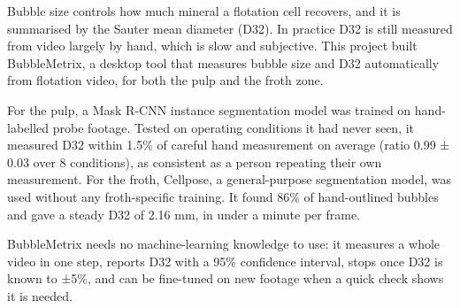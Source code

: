 Bubble size controls how much mineral a flotation cell recovers, and it is
summarised by the Sauter mean diameter (D32). In practice D32 is still
measured from video largely by hand, which is slow and subjective. This
project built BubbleMetrix, a desktop tool that measures bubble size and
D32 automatically from flotation video, for both the pulp and the froth
zone.

For the pulp, a Mask R-CNN instance segmentation model was trained on
hand-labelled probe footage. Tested on operating conditions it had never
seen, it measured D32 within 1.5\% of careful hand measurement on average
(ratio 0.99 ± 0.03 over 8 conditions), as consistent as a person repeating
their own measurement. For the froth, Cellpose, a general-purpose
segmentation model, was used without any froth-specific training. It found
86\% of hand-outlined bubbles and gave a steady D32 of 2.16 mm, in under a
minute per frame.

BubbleMetrix needs no machine-learning knowledge to use: it measures a
whole video in one step, reports D32 with a 95\% confidence interval, stops
once D32 is known to ±5\%, and can be fine-tuned on new footage when a
quick check shows it is needed.
